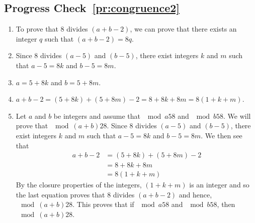 \subsection*{Progress Check~\ref{pr:congruence2}}
\begin{enumerate}
  \item To prove that 8 divides $(a + b - 2)$, we can prove that there exists an integer $q$ such that $(a + b - 2) = 8q$.
  \item Since 8 divides $(a - 5)$ and $(b - 5)$, there exist integers $k$ and $m$ such that 
$a - 5 = 8k$ and $b - 5 = 8m$.
  \item $a = 5 + 8k$ and $b = 5 + 8m$.
  \item $a + b - 2 = (5 + 8k) + (5 + 8m) - 2 = 8 + 8k + 8m = 8(1 + k + m)$.
  \item 
\begin{myproof}
Let $a$ and $b$ be integers and assume that $\mod{a}{5}{8}$ and $\mod{b}{5}{8}$.  We will prove that $\mod{(a + b)}{2}{8}$.  Since 8 divides $(a - 5)$ and $(b - 5)$, there exist integers $k$ and $m$ such that $a - 5 = 8k$ and $b - 5 = 8m$.  We then see that
\begin{align*}
a + b - 2 &= (5 + 8k) + (5 + 8m) - 2 \\
      &= 8 + 8k + 8m \\
      &= 8(1 + k + m)
\end{align*}
By the closure properties of the integers, $(1 + k + m)$ is an integer and so the last equation proves that 8 divides $(a + b - 2)$ and hence, $\mod{(a + b)}{2}{8}$.  This proves that if 
$\mod{a}{5}{8}$ and $\mod{b}{5}{8}$, then $\mod{(a + b)}{2}{8}$.
\end{myproof}
\end{enumerate}
\hbreak


\endinput

